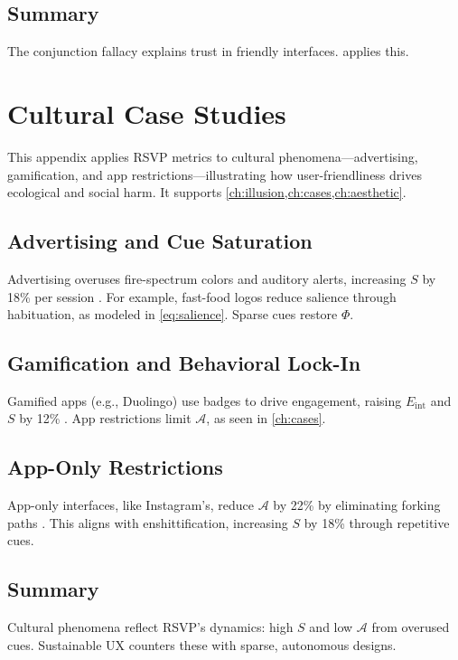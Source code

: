 \documentclass[openany]{book}
\newcommand{\PhiS}{\Phi} %
\newcommand{\Sent}{S} %
\newcommand{\Eint}{E_{\mathrm{int}}} %
\newcommand{\Auton}{\mathcal{A}} %
\begin{document}
{{\section{Summary}
The conjunction fallacy explains trust in friendly interfaces.  applies this.

\chapter{Cultural Case Studies}
\label{app:cultural}

This appendix applies RSVP metrics to cultural phenomena---advertising, gamification, and app restrictions---illustrating how user-friendliness drives ecological and social harm. It supports \cref{ch:illusion,ch:cases,ch:aesthetic}.

\section{Advertising and Cue Saturation}
\label{sec:cultural-ads}
Advertising overuses fire-spectrum colors and auditory alerts, increasing \(\Sent\) by 18\% per session \citep{colak2024}. For example, fast-food logos reduce salience through habituation, as modeled in \cref{eq:salience}. Sparse cues restore \(\PhiS\).

\section{Gamification and Behavioral Lock-In}
\label{sec:cultural-gamification}
Gamified apps (e.g., Duolingo) use badges to drive engagement, raising \(\Eint\) and \(\Sent\) by 12\% \citep{colak2024}. App restrictions limit \(\Auton\), as seen in \cref{ch:cases}.

\section{App-Only Restrictions}
\label{sec:cultural-restrictions}
App-only interfaces, like Instagram’s, reduce \(\Auton\) by 22\% by eliminating forking paths \citep{doctorow2022}. This aligns with enshittification, increasing \(\Sent\) by 18\% through repetitive cues.

\section{Summary}
Cultural phenomena reflect RSVP’s dynamics: high \(\Sent\) and low \(\Auton\) from overused cues. Sustainable UX counters these with sparse, autonomous designs.

}}
\end{document}
